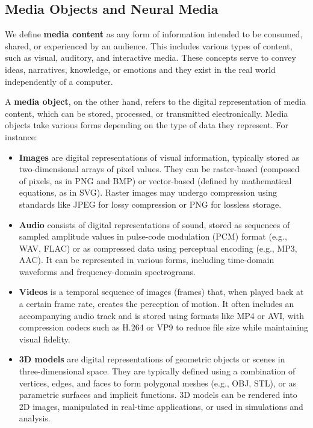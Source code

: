 \subsection{Media Objects and Neural Media}

We define \textbf{media content} as any form of information intended to be consumed, shared, or experienced by an audience. This includes various types of content, such as visual, auditory, and interactive media. These concepts serve to convey ideas, narratives, knowledge, or emotions and they exist in the real world independently of a computer.

A \textbf{media object}, on the other hand, refers to the digital representation of media content, which can be stored, processed, or transmitted electronically. Media objects take various forms depending on the type of data they represent. For instance:

\begin{itemize}
\item \textbf{Images} are digital representations of visual information, typically stored as two-dimensional arrays of pixel values. They can be raster-based (composed of pixels, as in PNG and BMP) or vector-based (defined by mathematical equations, as in SVG). Raster images may undergo compression using standards like JPEG for lossy compression or PNG for lossless storage.

\item \textbf{Audio} consists of digital representations of sound, stored as sequences of sampled amplitude values in pulse-code modulation (PCM) format (e.g., WAV, FLAC) or as compressed data using perceptual encoding (e.g., MP3, AAC). It can be represented in various forms, including time-domain waveforms and frequency-domain spectrograms.
 
\item \textbf{Videos} is a temporal sequence of images (frames) that, when played back at a certain frame rate, creates the perception of motion. It often includes an accompanying audio track and is stored using formats like MP4 or AVI, with compression codecs such as H.264 or VP9 to reduce file size while maintaining visual fidelity.

\item \textbf{3D models} are digital representations of geometric objects or scenes in three-dimensional space. They are typically defined using a combination of vertices, edges, and faces to form polygonal meshes (e.g., OBJ, STL), or as parametric surfaces and implicit functions. 3D models can be rendered into 2D images, manipulated in real-time applications, or used in simulations and analysis.
\end{itemize}

